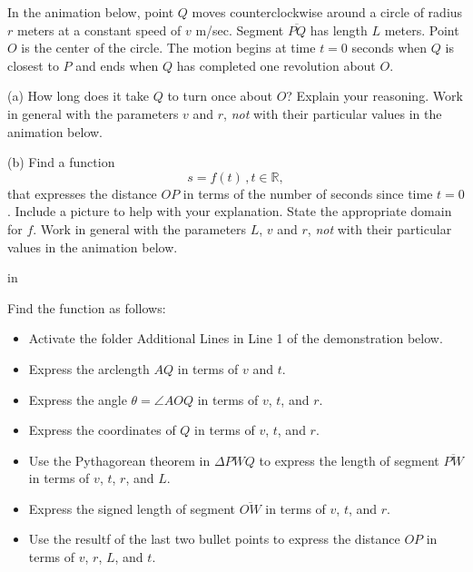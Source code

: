 \documentclass{ximera}
\newcommand{\pskip}{\vskip 0.1 in}
\begin{document}
\begin{question} \label{Q7:RightTriangle}
In the animation below, point $Q$ moves counterclockwise around a circle of radius $r$ meters at a constant speed of $v$ m/sec. Segment $\overline{PQ}$ has length $L$ meters. Point $O$ is the center of the circle. The motion begins at time $t=0$ seconds when $Q$ is closest to $P$ and ends when $Q$ has completed one revolution about $O$.

(a) How long does it take $Q$ to turn once about $O$? Explain your reasoning. Work in general with the parameters $v$ and $r$, \emph{not} with their particular values in the animation below.

(b) Find a function 
\[
    s = f(t) \, , t \in \mathbb{R} ,
\] 
that expresses the distance $OP$ in terms of the number of seconds since time $t=0$. Include a picture to help with your explanation. State the appropriate domain for $f$. Work in general with the parameters $L$, $v$ and $r$, \emph{not} with their particular values in the animation below.

\pskip

Find the function as follows:

\begin{itemize}

\item{Activate the folder Additional Lines in Line 1 of the demonstration below.}

\item{Express the arclength $AQ$ in terms of $v$ and $t$.}

\item{Express the angle $\theta =\angle AOQ$ in terms of $v$, $t$, and $r$.}

\item{Express the coordinates of $Q$ in terms of $v$, $t$, and $r$.}

\item{Use the Pythagorean theorem in $\Delta PWQ$ to express the length of segment $\overline{PW}$ in terms of $v$, $t$, $r$, and $L$.}

\item{Express the signed length of segment $\overline{OW}$ in terms of $v$, $t$, and $r$.}

\item{Use the resultf of the last two bullet points to express the distance $OP$ in terms of $v$, $r$, $L$, and $t$.}

\end{itemize}



\end{question}
\end{document}
